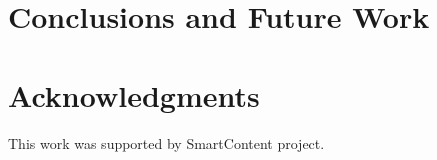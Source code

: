 \documentclass{llncs}
\begin{document}
%


\section{Conclusions and Future Work}\label{sec:Conclusions}





\section*{Acknowledgments}

This work was supported by SmartContent project.



%






\clearpage
{} %
\renewcommand{\indexname}{Author Index}
\printindex \clearpage
{} %
\renewcommand{\indexname}{Subject Index}
 
\end{document}
